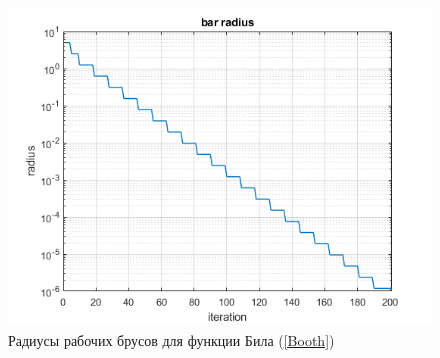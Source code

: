 \documentclass[12pt,a4paper]{article}
\begin{document}
                
                \begin{figure}[H]
                    \centering
                    \includegraphics[width=13cm]{Booth_rad.png}
                    \caption{Радиусы рабочих брусов для функции Била (\ref{Booth})}
                    \label{fig:Boot4}
                \end{figure}
                
                
	
\end{document}
